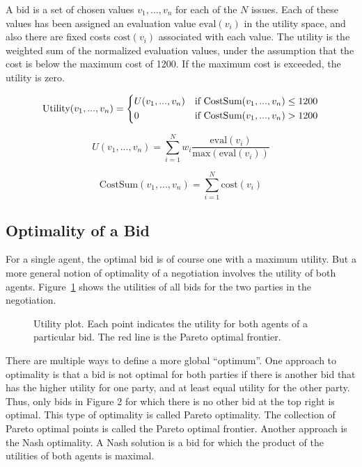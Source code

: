 \documentclass[]{article}
\begin{document}
A bid is a set of chosen values $v_1, ..., v_n$  for each of the $N$ issues. Each of these values has been assigned an evaluation value $\text{eval}(v_i)$ in the utility space, and also there are fixed costs $\text{cost}(v_i)$ associated with each value. The utility is the weighted sum of the normalized evaluation values, under the assumption that the cost is below the maximum cost of 1200. If the maximum cost is exceeded, the utility is zero.

\begin{equation}
	\text{Utility}(v_1, ..., v_n) = 
		\begin{dcases*}
			U(v_1, ..., v_n) & if CostSum$(v_1, ..., v_n) \leq 1200$\\
			0 & if CostSum$(v_1, ..., v_n) > 1200$\\
		\end{dcases*}
\label{eqn:Utility}
\end{equation}

\begin{equation}
	U(v_1, ..., v_n) = \sum_{i=1}^{N} w_i \dfrac{\text{eval}(v_i)}{\text{max}(\text{eval}(v_i))}
\end{equation}

\begin{equation}
	\text{CostSum}(v_1, ..., v_n) = \sum_{i=1}^{N} \text{cost}(v_i)
\end{equation}

\subsection{Optimality of a Bid}
For a single agent, the optimal bid is of course one with a maximum utility. But a more general notion of optimality of a negotiation involves the utility of both agents. Figure~\ref{Fig:utility plot} shows the utilities of all bids for the two parties in the negotiation. 
 
\begin{figure}
\caption{Utility plot. Each point indicates the utility for both agents of a particular bid. The red line is the Pareto optimal frontier.}\label{Fig:utility plot}
\end{figure}

There are multiple ways to define a more global ``optimum''. One approach to optimality is that a bid is not optimal for both parties if there is another bid that has the higher utility for one party, and at least equal utility for the other party. Thus, only bids in Figure 2 for which there is no other bid at the top right is optimal. This type of optimality is called Pareto optimality. The collection of Pareto optimal points is called the Pareto optimal frontier. Another approach is the Nash optimality. A Nash solution is a bid for which the product of the utilities of both agents is maximal. 
 
\end{document}
